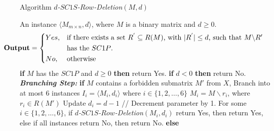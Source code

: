 \documentclass[review, 1p]{elsarticle}
\begin{document}
  \begin{algorithm}[h]
\caption{Algorithm  \textit{$d$-$SC1S$-$Row$-Deletion}$(M,d)$ \label{alg5}}
\begin{algorithmic}[1] 
 \Require An instance $\langle M_{m \times n},d \rangle$, where $M$ is a binary matrix and $d \geq 0$. \vspace{-0.1 in} \[ \hspace{-0.48 in}\textbf{Output} = \begin{dcases*} Yes,  & if there exists a set  $R^{'} \subseteq R(M)$, with $\vert R^{'} \vert \leq d$, such that $M \backslash R'$ \\  
        & has the $SC1P$.  
   \\  
   No,    & otherwise
\end{dcases*}
\] \vspace{-0.2 in}
 \State \textbf{if} {$M$ has the $SC1P$ and $d \geq 0$} \textbf{then} return Yes. \vspace{-0.05 in}
 \State \textbf{if}  {$d < 0$} \textbf{then} return No. \vspace{-0.05 in} \newline \vspace{-0.05 in} 
 \noindent \textit{\textbf{Branching Step:}}
\State \textbf{if} {$M$ contains a forbidden submatrix $M'$ from $X$}, \vspace{-0.05 in}
    \newline \vspace{-0.05 in}
  \indent Branch into at most $6$  instances $I_{i}=\langle M_{i}, d_{i}\rangle$ where $i \in \{1,2,\ldots,6\}$ \vspace{-0.03 in} \newline \vspace{-0.03in}
  \indent $M_{i} = M \backslash r_{i}$, where $r_{i} \in R(M')$ \vspace{-0.03 in} \newline  \vspace{-0.03 in}
 \indent Update $d_{i} = d -1$  \hspace{1.0 in}// Decrement parameter by 1. \vspace{-0.03 in} \newline \vspace{-0.03 in} 
\noindent For some $i \in \{1,2,\ldots,6\}$, if \textit{$d$-$SC1S$-$Row$-Deletion}$(M_{i},d_{i})$ return Yes, then return Yes, else if all instances return No, then return No.  \vspace{-0.05 in}
\State \textbf{else}\vspace{-0.05 in}

\end{algorithmic}
\end{algorithm}
\end{document}
